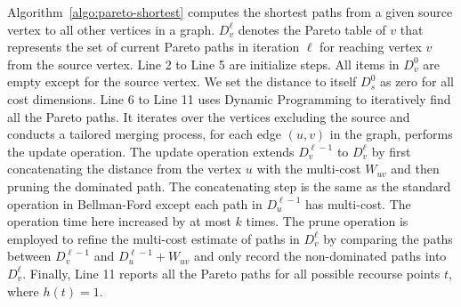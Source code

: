 \begin{comment}
\begin{figure}[ht!]
\centering
\texttt{[image: suv.pdf]}
\caption{An instance to show use vertex $u$ to relax the multi-cost of the path from $s$ to $v$.}
\label{fig:update operation}
\vspace{0.3cm}
\end{figure}
\end{comment}

Algorithm~\ref{algo:pareto-shortest} computes the shortest paths from a given source vertex to all other vertices in a graph. $D^\ell_v$ denotes the Pareto table of $v$ that represents the set of current Pareto paths in iteration $\ell$ for reaching vertex $v$ from the source vertex. Line 2 to Line 5 are initialize steps. All items in $D^0_v$ are empty except for the source vertex. We set the distance to itself $D^0_s$ as zero for all cost dimensions. Line 6 to Line 11 uses Dynamic Programming to iteratively find all the Pareto paths. It iterates over the vertices excluding the source and conducts a tailored merging process, for each edge $(u, v)$ in the graph, performs the update operation. The update operation extends $D^{\ell-1}_v$ to $D^{\ell}_v$ by first concatenating the distance from the vertex $u$ with the multi-cost $W_{uv}$ and then pruning the dominated path. The concatenating step is the same as the standard operation in Bellman-Ford except each path in $D^{\ell-1}_u$ has multi-cost. The operation time here increased by at most $k$ times. The prune operation is employed to refine the multi-cost estimate of paths in $D^\ell_v$ by comparing the paths between $D_v^{\ell-1}$ and $D_u^{\ell-1}+W_{uv}$ and only record the non-dominated paths into $D_v^{\ell}$. Finally, Line 11 reports all the Pareto paths for all possible recourse points $t$, where $h(t)=1$.



